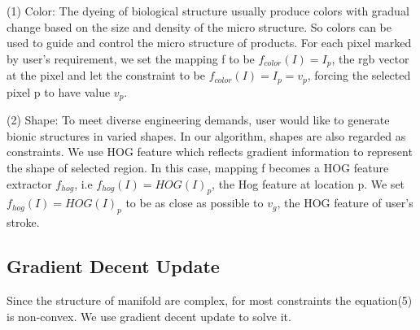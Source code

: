 (1) Color: The dyeing of biological structure usually produce colors with gradual change based on the size and density of the micro structure. So colors can be used to guide and control the micro structure of products. For each pixel marked by user's requirement, we set the mapping f to be $f_{color}(I) = I_p$, the rgb vector at the pixel and let the constraint to be $f_{color}(I) = I_p=v_p$, forcing the selected pixel p to have value $v_p$.\

(2) Shape: To meet diverse engineering demands, user would like to generate bionic structures in varied shapes. In our algorithm, shapes are also regarded as constraints. We use HOG feature which reflects gradient information to represent the shape of selected region. In this case, mapping f becomes a HOG feature extractor $f_{hog}$, i.e $f_{hog}(I)=HOG(I)_p$, the Hog feature at location p. We set $f_{hog}(I) = HOG(I)_p$ to be as close as possible to $v_g$, the HOG feature of user’s stroke.

\subsection{Gradient Decent Update}
Since the structure of manifold are complex, for most constraints the equation(5) is non-convex. We use gradient decent update to solve it. 